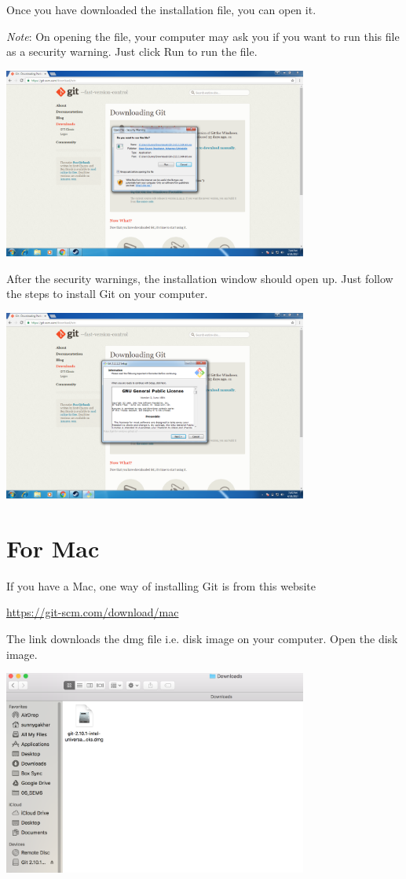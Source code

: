 \documentclass[12pt]{report}
\begin{document}
\noindent
Once you have downloaded the installation file, you can open it. 

\textit{Note}: On opening the file, your computer may ask you if you want to run this file as a security warning. Just click Run to run the file.

\includegraphics[width=0.75\textwidth]{security.png}

After the security warnings, the installation window should open up. Just follow the steps to install Git on your computer.

\includegraphics[width=0.75\textwidth]{windows-install.png}

\section{For Mac}

If you have a Mac, one way of installing Git is from this website

\url{https://git-scm.com/download/mac}

The link downloads the dmg file i.e. disk image on your computer. Open the disk image.

\includegraphics[width=0.75\textwidth]{git-mac-disk.png}
\end{document}
